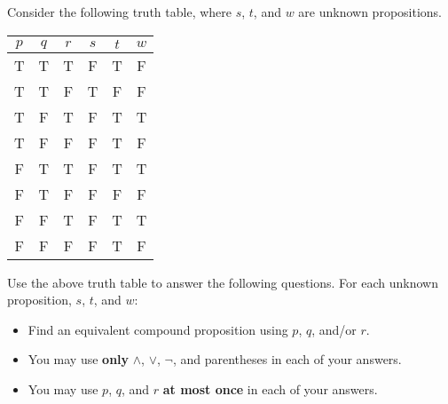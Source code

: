 \documentclass[12pt]{exam}
\begin{document}
Consider the following truth table, where $s$, $t$, and $w$ are unknown propositions.

\begin{center}
	\begin{tabular}{|c c c|| c | c | c |}
		\hline
		$p$                             & $q$                             & $r$                              &
		\hspace{0.8cm}$s$\hspace{0.8cm} & \hspace{0.8cm}$t$\hspace{0.8cm} & \hspace{0.8cm}$w$\hspace*{0.8cm}             \\\hline
		T                               & T                               & T                                & F & T & F \\\hline
		T                               & T                               & F                                & T & F & F \\\hline
		T                               & F                               & T                                & F & T & T \\\hline
		T                               & F                               & F                                & F & T & F \\\hline
		F                               & T                               & T                                & F & T & T \\\hline
		F                               & T                               & F                                & F & F & F \\\hline
		F                               & F                               & T                                & F & T & T \\\hline
		F                               & F                               & F                                & F & T & F \\\hline
	\end{tabular}
\end{center}

Use the above truth table to answer the following questions. For each unknown proposition, $s$, $t$, and $w$:
\begin{itemize}
	\item Find an equivalent compound proposition using $p$, $q$, and/or $r$.
	\item You may use \textbf{only} $\land$, $\lor$, $\neg$, and parentheses in each of your answers.
	\item You may use $p$, $q$, and $r$ \textbf{at most once} in each of your answers.
\end{itemize}
\end{document}
